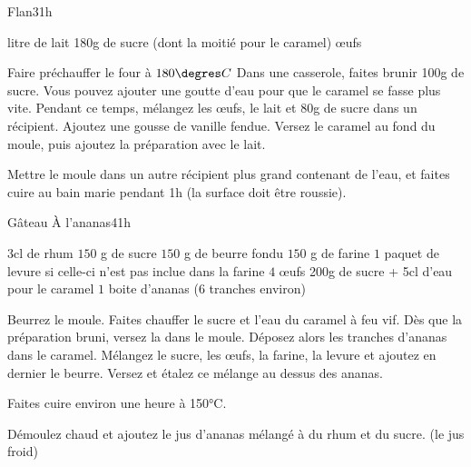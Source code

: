 \begin{recette}{Flan}{3}{}{1h}
\begin{ingredients}
 litre de lait
\ingredient 180g de sucre (dont la moitié pour le caramel)
 œufs
\end{ingredients}

\begin{preparation}
\etape Faire préchauffer le four à $180\degres C$
\etape Dans une casserole, faites brunir 100g de sucre. Vous pouvez ajouter une goutte d'eau pour que le caramel se fasse plus vite.
\etape Pendant ce temps, mélangez les œufs, le lait et 80g de sucre dans un récipient. Ajoutez une gousse de vanille fendue.
\etape Versez le caramel au fond du moule, puis ajoutez la préparation avec le lait.
\end{preparation}

\begin{cuisson}
Mettre le moule dans un autre récipient plus grand contenant de l'eau, et faites cuire au bain marie pendant 1h (la surface doit être roussie).
\end{cuisson}
\end{recette}

\begin{recette}{Gâteau À l'ananas}{4}{}{1h}
\begin{ingredients}
\ingredient 3cl de rhum
\ingredient $150$ g de sucre
\ingredient $150$ g de beurre fondu
\ingredient $150$ g de farine
\ingredient $1$ paquet de levure si celle-ci n'est pas inclue dans la farine
\ingredient $4$ œufs
\ingredient 200g de sucre + 5cl d'eau pour le caramel
\ingredient $1$ boite d'ananas ($6$ tranches environ)
\end{ingredients}

\begin{preparation}
\etape Beurrez le moule. 
\etape Faites chauffer le sucre et l'eau du caramel à feu vif. Dès que la préparation bruni, versez la dans le moule. 
\etape Déposez alors les tranches d'ananas dans le caramel.
\etape Mélangez le sucre, les œufs, la farine, la levure et ajoutez en dernier le beurre.
\etape Versez et étalez ce mélange au dessus des ananas.
\end{preparation}

\begin{cuisson}
Faites cuire environ une heure à 150°C.

Démoulez chaud et ajoutez le jus d'ananas mélangé à du rhum et du sucre. (le jus froid)
\end{cuisson}

\end{recette}

